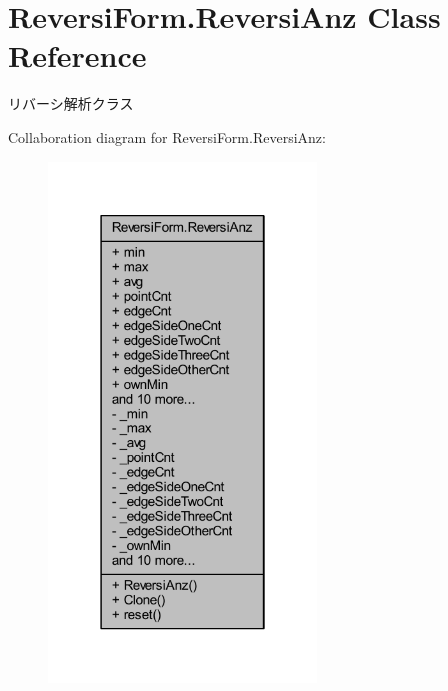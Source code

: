 \hypertarget{class_reversi_form_1_1_reversi_anz}{}\section{Reversi\+Form.\+Reversi\+Anz Class Reference}
\label{class_reversi_form_1_1_reversi_anz}


リバーシ解析クラス  




Collaboration diagram for Reversi\+Form.\+Reversi\+Anz\+:
\nopagebreak
\begin{figure}[H]
\begin{center}
\leavevmode
\includegraphics[width=202pt]{class_reversi_form_1_1_reversi_anz__coll__graph}
\end{center}
\end{figure}

